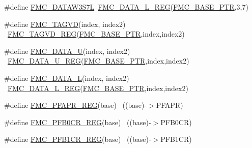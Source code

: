 \begin{DoxyCompactItemize}
\item 
\#define \hyperlink{group___f_m_c___register___accessor___macros_gade0c0cc74a0369065c0bfe3ab9dcc130}{F\+M\+C\+\_\+\+D\+A\+T\+A\+W3\+S7L}~\hyperlink{group___f_m_c___register___accessor___macros_ga4a86395060ba1ded814dbe8cc6eb0e8c}{F\+M\+C\+\_\+\+D\+A\+T\+A\+\_\+\+L\+\_\+\+R\+EG}(\hyperlink{group___f_m_c___peripheral_ga0a740437b573e32e6b932bf729485fd9}{F\+M\+C\+\_\+\+B\+A\+S\+E\+\_\+\+P\+TR},3,7)
\item 
\#define \hyperlink{group___f_m_c___register___accessor___macros_ga26f85925aef70f6e17960b39e8cf4cbf}{F\+M\+C\+\_\+\+T\+A\+G\+VD}(index,  index2)                                ~\hyperlink{group___f_m_c___register___accessor___macros_ga69adb2f34bbe33d04c2075cee0e7d5f4}{F\+M\+C\+\_\+\+T\+A\+G\+V\+D\+\_\+\+R\+EG}(\hyperlink{group___f_m_c___peripheral_ga0a740437b573e32e6b932bf729485fd9}{F\+M\+C\+\_\+\+B\+A\+S\+E\+\_\+\+P\+TR},index,index2)
\item 
\#define \hyperlink{group___f_m_c___register___accessor___macros_ga1adb60730dd146af0cc2bc261a312630}{F\+M\+C\+\_\+\+D\+A\+T\+A\+\_\+U}(index,  index2)                              ~\hyperlink{group___f_m_c___register___accessor___macros_ga77e953c0a13be535a400b4fce86c0601}{F\+M\+C\+\_\+\+D\+A\+T\+A\+\_\+\+U\+\_\+\+R\+EG}(\hyperlink{group___f_m_c___peripheral_ga0a740437b573e32e6b932bf729485fd9}{F\+M\+C\+\_\+\+B\+A\+S\+E\+\_\+\+P\+TR},index,index2)
\item 
\#define \hyperlink{group___f_m_c___register___accessor___macros_gaac99bb7cb52088a4b086e2967c353743}{F\+M\+C\+\_\+\+D\+A\+T\+A\+\_\+L}(index,  index2)                              ~\hyperlink{group___f_m_c___register___accessor___macros_ga4a86395060ba1ded814dbe8cc6eb0e8c}{F\+M\+C\+\_\+\+D\+A\+T\+A\+\_\+\+L\+\_\+\+R\+EG}(\hyperlink{group___f_m_c___peripheral_ga0a740437b573e32e6b932bf729485fd9}{F\+M\+C\+\_\+\+B\+A\+S\+E\+\_\+\+P\+TR},index,index2)
\item 
\#define \hyperlink{group___f_m_c___register___accessor___macros_gad43fcfd90789921daaef07d85d5da199}{F\+M\+C\+\_\+\+P\+F\+A\+P\+R\+\_\+\+R\+EG}(base)                                        ~((base)-\/$>$P\+F\+A\+PR)
\item 
\#define \hyperlink{group___f_m_c___register___accessor___macros_gabab99bf1038b07a5ffe56d7075184b65}{F\+M\+C\+\_\+\+P\+F\+B0\+C\+R\+\_\+\+R\+EG}(base)                                      ~((base)-\/$>$P\+F\+B0\+CR)
\item 
\#define \hyperlink{group___f_m_c___register___accessor___macros_gaf6b5ee99ce57d8870974b8bc5928a19f}{F\+M\+C\+\_\+\+P\+F\+B1\+C\+R\+\_\+\+R\+EG}(base)                                      ~((base)-\/$>$P\+F\+B1\+CR)

\end{DoxyCompactItemize}
